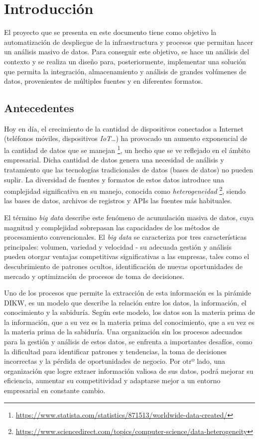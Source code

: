\chapter{Introducción}\label{chap:intro}
El proyecto que se presenta en este documento tiene como objetivo la
automatización de despliegue de la infraestructura y procesos que permitan hacer
un análisis masivo de datos. Para conseguir este objetivo, se hace un
análisis del contexto y se realiza un diseño para, posteriormente, implementar
una solución que permita la integración, almacenamiento y análisis de grandes
volúmenes de datos, provenientes de múltiples fuentes y en diferentes formatos.


\section{Antecedentes}\label{sec:antecedentes}
Hoy en día, el crecimiento de la cantidad de dispositivos conectados a Internet
(teléfonos móviles, dispositivos \textit{IoT}\ldots) ha provocado un aumento
exponencial de la cantidad de datos que se manejan \footnote{
	\url{https://www.statista.com/statistics/871513/worldwide-data-created/}
}, un hecho que se ve reflejado en el ámbito empresarial. Dicha cantidad de
datos genera una necesidad de análisis y tratamiento que las tecnologías
tradicionales de datos (bases de datos) no pueden suplir. La diversidad de
fuentes y formatos de estos datos introduce una complejidad significativa en su
manejo, conocida como \textit{heterogeneidad} \footnote{
	\url{https://www.sciencedirect.com/topics/computer-science/data-heterogeneity}
}, siendo las bases de datos, archivos de registros y APIs las fuentes más
habituales.

El término \textit{big data} describe este fenómeno de acumulación masiva de
datos, cuya magnitud y complejidad sobrepasan las capacidades de los métodos de
procesamiento convencionales. El \textit{big data} se caracteriza por tres
características principales: volumen, variedad y velocidad - su adecuada gestión
y análisis pueden otorgar ventajas competitivas significativas a las empresas,
tales como el descubrimiento de patrones ocultos, identificación de nuevas
oportunidades de mercado y optimización de procesos de toma de decisiones.

Uno de los procesos que permite la extracción de esta información es la pirámide
DIKW, \cite{enwiki:1211227190} es un modelo que describe la relación entre los
datos, la información, el conocimiento y la sabiduría. Según este modelo, los
datos son la materia prima de la información, que a su vez es la materia prima
del conocimiento, que a su vez es la materia prima de la sabiduría. Una
organización sin los procesos adecuados para la gestión y análisis de estos
datos, se enfrenta a importantes desafíos, como la dificultad para identificar
patrones y tendencias, la toma de decisiones incorrectas y la pérdida de
oportunidades de negocio. Por otrº lado, una organización que logre extraer
información valiosa de sus datos, podrá mejorar su eficiencia, aumentar su
competitividad y adaptarse mejor a un entorno empresarial en constante cambio.


